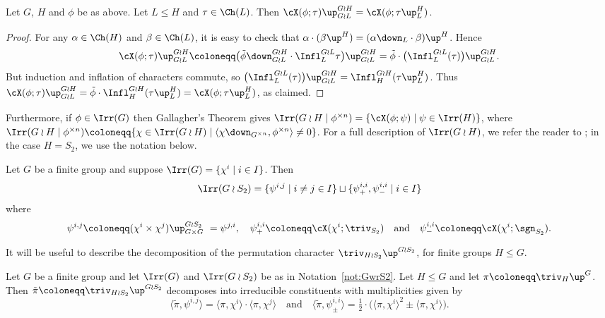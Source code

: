 \begin{lemma}\label{lem:infl-ind}
	Let $G$, $H$ and $\phi$ be as above. Let $L\le H$ and $\tau\in\Ch(L)$. Then $\cX(\phi;\tau)\up_{G\wr L}^{G\wr H} = \cX(\phi;\tau\up_L^H)$.
\end{lemma}
\begin{proof}
	For any $\alpha\in\Ch(H)$ and $\beta\in\Ch(L)$, it is easy to check that $\alpha\cdot(\beta\up^H)=(\alpha\down_L\cdot \beta)\up^H$. Hence
	\[ \cX(\phi;\tau)\up_{G\wr L}^{G\wr H} \coloneqq  \big( \tilde{\phi}\down_{G\wr L}^{G\wr H}\cdot\Infl_L^{G\wr L}\tau\big)\up_{G\wr L}^{G\wr H} = \tilde{\phi} \cdot \big(\Infl_L^{G\wr L}(\tau)\big)\up_{G\wr L}^{G\wr H}. \]
	But induction and inflation of characters commute, so $\big(\Infl_L^{G\wr L}(\tau)\big)\up_{G\wr L}^{G\wr H} = \Infl_H^{G\wr H}(\tau\up_L^H)$. Thus $\cX(\phi;\tau)\up_{G\wr L}^{G\wr H} = \tilde{\phi}\cdot \Infl_H^{G\wr H}(\tau\up_L^H) = \cX(\phi;\tau\up_L^H)$, as claimed.
\end{proof}

Furthermore, if $\phi\in\Irr(G)$ then Gallagher's Theorem \cite[Corollary 6.17]{I} gives $\Irr(G\wr H\mid \phi^{\times n}) = \{\cX(\phi;\psi)\mid \psi\in\Irr(H)\}$, where $\Irr(G\wr H\mid \phi^{\times n})\coloneqq \{\chi\in\Irr(G\wr H)\mid \langle \chi\down_{G^{\times n}}, \phi^{\times n}\rangle \ne 0 \}$.
For a full description of $\Irr(G\wr H)$, we refer the reader to \cite[Chapter 4]{JK}; in the case $H=S_2$, we use the notation below.

\begin{notation}\label{not:GwrS2}
	Let $G$ be a finite group and suppose $\Irr(G)=\{\chi^i \mid i\in I\}$. Then 
	\[ \Irr(G\wr S_2) = \{ \psi^{i,j} \mid i\ne j\in I \} \sqcup \{ \psi^{i,i}_+, \psi^{i,i}_- \mid i\in I \} \]
	where 
	\[ \psi^{i,j} \coloneqq  (\chi^i\times\chi^j)\up_{G\times G}^{G\wr S_2}\ = \psi^{j,i},\quad \psi^{i,i}_{+} \coloneqq  \cX(\chi^i;\triv_{S_2})\quad\text{and}\quad \psi^{i,i}_{-} \coloneqq  \cX(\chi^i;\sgn_{S_2}). \]
\end{notation}

It will be useful to describe the decomposition of the permutation character $\triv_{H\wr S_2}\up^{G\wr S_2}$, for finite groups $H\le G$.

\begin{lemma}\label{lem:Prop1.2}
	Let $G$ be a finite group and let $\Irr(G)$ and $\Irr(G\wr S_2)$ be as in Notation~\ref{not:GwrS2}.
	Let $H\leq G$ and let $\pi \coloneqq  \triv_{H}\up^{G}$. Then $\tilde{\pi} \coloneqq  \triv_{H\wr S_2}\up^{G\wr S_2}$ decomposes into irreducible constituents with multiplicities given by
	\[ \langle\tilde{\pi},\psi^{i,j}\rangle = \langle\pi,\chi^i\rangle \cdot \langle\pi,\chi^j\rangle \quad\text{and}\quad \langle\tilde{\pi},\psi^{i,i}_{\pm}\rangle = \tfrac{1}{2}\cdot\big( \langle\pi,\chi^i\rangle^2 \pm \langle\pi,\chi^i\rangle \big). \]
\end{lemma}

